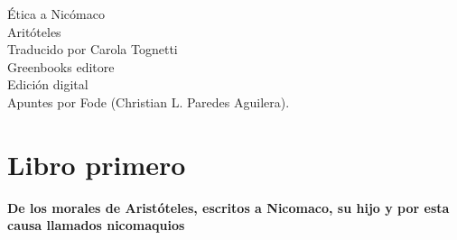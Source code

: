 \begin{center}
    \huge Ética a Nicómaco\\
    \vspace*{0.5cm}
    \large Aritóteles\\
    Traducido por Carola Tognetti\\
    Greenbooks editore\\
    Edición digital\\
    \vspace{1cm}
    \Large Apuntes por Fode (Christian L. Paredes Aguilera).
    \vspace{1.5cm}
\end{center}

\part*{Libro primero}
\textbf{\Large De los morales de Aristóteles, escritos a Nicomaco, su hijo y por esta causa llamados nicomaquios}

